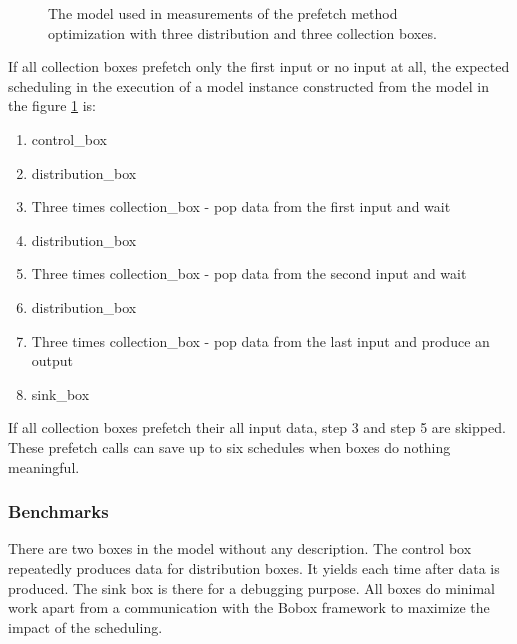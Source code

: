 \begin{figure}[h!]
\caption{The model used in measurements of the prefetch method optimization with three distribution and three collection boxes.}
\label{prefetch-model}
\end{figure}

If all collection boxes prefetch only the first input or no input at all, the expected scheduling in the execution of a model instance constructed from the model in the figure \ref{prefetch-model} is:

\begin{enumerate}
\item{control\_box}
\item{distribution\_box}
\item{Three times collection\_box - pop data from the first input and wait}
\item{distribution\_box}
\item{Three times collection\_box - pop data from the second input and wait}
\item{distribution\_box}
\item{Three times collection\_box - pop data from the last input and produce an output}
\item{sink\_box}
\end{enumerate}

If all collection boxes prefetch their all input data, step 3 and step 5 are skipped. These prefetch calls can save up to six schedules when boxes do nothing meaningful.

\subsubsection{Benchmarks}
There are two boxes in the model without any description. The control box repeatedly produces data for distribution boxes. It yields each time after data is produced. The sink box is there for a debugging purpose. All boxes do minimal work apart from a communication with the Bobox framework to maximize the impact of the scheduling.

